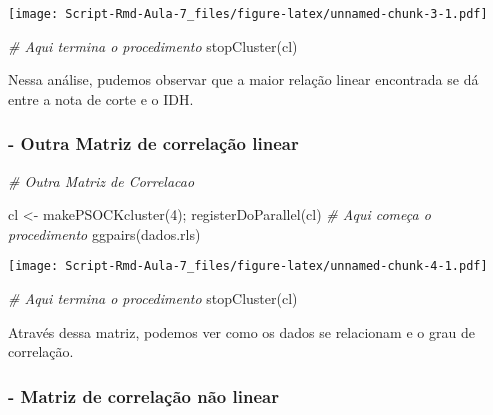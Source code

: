 \documentclass[
]{article}
\newenvironment{Shaded}{\begin{snugshade}}{\end{snugshade}}
\newcommand{\CommentTok}[1]{\textcolor[rgb]{0.56,0.35,0.01}{\textit{#1}}}
\newcommand{\DecValTok}[1]{\textcolor[rgb]{0.00,0.00,0.81}{#1}}
\newcommand{\FunctionTok}[1]{\textcolor[rgb]{0.00,0.00,0.00}{#1}}
\newcommand{\NormalTok}[1]{#1}
\newcommand{\OtherTok}[1]{\textcolor[rgb]{0.56,0.35,0.01}{#1}}
\begin{document}
\texttt{[image: Script-Rmd-Aula-7\_files/figure-latex/unnamed-chunk-3-1.pdf]}

\begin{Shaded}
\begin{Highlighting}[]
\CommentTok{\# Aqui termina o procedimento}
\FunctionTok{stopCluster}\NormalTok{(cl)}
\end{Highlighting}
\end{Shaded}

Nessa análise, pudemos observar que a maior relação linear encontrada se
dá entre a nota de corte e o IDH.

\hypertarget{outra-matriz-de-correlauxe7uxe3o-linear}{%
\subsubsection{- Outra Matriz de correlação
linear}\label{outra-matriz-de-correlauxe7uxe3o-linear}}

\begin{Shaded}
\begin{Highlighting}[]
\CommentTok{\# Outra Matriz de Correlacao}

\NormalTok{cl }\OtherTok{\textless{}{-}} \FunctionTok{makePSOCKcluster}\NormalTok{(}\DecValTok{4}\NormalTok{); }\FunctionTok{registerDoParallel}\NormalTok{(cl)}
\CommentTok{\# Aqui começa o procedimento}
\FunctionTok{ggpairs}\NormalTok{(dados.rls)}
\end{Highlighting}
\end{Shaded}

\texttt{[image: Script-Rmd-Aula-7\_files/figure-latex/unnamed-chunk-4-1.pdf]}

\begin{Shaded}
\begin{Highlighting}[]
\CommentTok{\# Aqui termina o procedimento}
\FunctionTok{stopCluster}\NormalTok{(cl)}
\end{Highlighting}
\end{Shaded}

Através dessa matriz, podemos ver como os dados se relacionam e o grau
de correlação.

\hypertarget{matriz-de-correlauxe7uxe3o-nuxe3o-linear}{%
\subsubsection{- Matriz de correlação não
linear}\label{matriz-de-correlauxe7uxe3o-nuxe3o-linear}}
\end{document}
